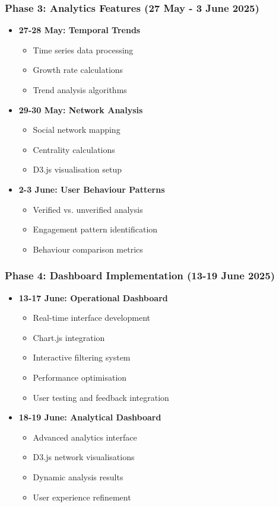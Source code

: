 \documentclass[11pt,a4paper]{article}
\begin{document}
\subsubsection{Phase 3: Analytics Features (27 May - 3 June 2025)}
\begin{itemize}
    \item \textbf{27-28 May: Temporal Trends}
    \begin{itemize}
        \item Time series data processing
        \item Growth rate calculations
        \item Trend analysis algorithms
    \end{itemize}
    \item \textbf{29-30 May: Network Analysis}
    \begin{itemize}
        \item Social network mapping
        \item Centrality calculations
        \item D3.js visualisation setup
    \end{itemize}
    \item \textbf{2-3 June: User Behaviour Patterns}
    \begin{itemize}
        \item Verified vs. unverified analysis
        \item Engagement pattern identification
        \item Behaviour comparison metrics
    \end{itemize}
\end{itemize}

\subsubsection{Phase 4: Dashboard Implementation (13-19 June 2025)}
\begin{itemize}
    \item \textbf{13-17 June: Operational Dashboard}
    \begin{itemize}
        \item Real-time interface development
        \item Chart.js integration
        \item Interactive filtering system
        \item Performance optimisation
        \item User testing and feedback integration
    \end{itemize}
    \item \textbf{18-19 June: Analytical Dashboard}
    \begin{itemize}
        \item Advanced analytics interface
        \item D3.js network visualisations
        \item Dynamic analysis results
        \item User experience refinement
    \end{itemize}
\end{itemize}
\end{document}
